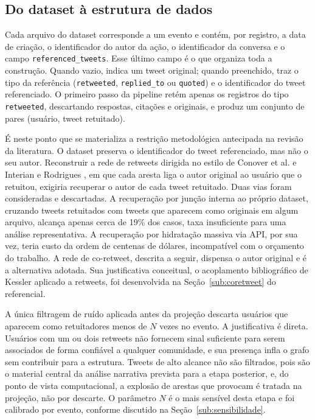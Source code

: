 \documentclass[conference]{IEEEtran}
\begin{document}
\subsection{Do dataset à estrutura de dados}
\label{sub:dataset}

Cada arquivo do dataset corresponde a um evento e contém, por registro, a data de criação, o identificador do autor da ação, o identificador da conversa e o campo \texttt{referenced\_tweets}. Esse último campo é o que organiza toda a construção. Quando vazio, indica um tweet original; quando preenchido, traz o tipo da referência (\texttt{retweeted}, \texttt{replied\_to} ou \texttt{quoted}) e o identificador do tweet referenciado. O primeiro passo da pipeline retém apenas os registros do tipo \texttt{retweeted}, descartando respostas, citações e originais, e produz um conjunto de pares (usuário, tweet retuitado).

É neste ponto que se materializa a restrição metodológica antecipada na revisão da literatura. O dataset preserva o identificador do tweet referenciado, mas não o seu autor. Reconstruir a rede de retweets dirigida no estilo de Conover et al. \cite{b_conover2011} e Interian e Rodrigues \cite{b_interian2023}, em que cada aresta liga o autor original ao usuário que o retuitou, exigiria recuperar o autor de cada tweet retuitado. Duas vias foram consideradas e descartadas. A recuperação por junção interna ao próprio dataset, cruzando tweets retuitados com tweets que aparecem como originais em algum arquivo, alcança apenas cerca de 19\% dos casos, taxa insuficiente para uma análise representativa. A recuperação por hidratação massiva via API, por sua vez, teria custo da ordem de centenas de dólares, incompatível com o orçamento do trabalho. A rede de co-retweet, descrita a seguir, dispensa o autor original e é a alternativa adotada. Sua justificativa conceitual, o acoplamento bibliográfico de Kessler \cite{b_kessler1963} aplicado a retweets, foi desenvolvida na Seção~\ref{sub:coretweet} do referencial.

A única filtragem de ruído aplicada antes da projeção descarta usuários que aparecem como retuitadores menos de $N$ vezes no evento. A justificativa é direta. Usuários com um ou dois retweets não fornecem sinal suficiente para serem associados de forma confiável a qualquer comunidade, e sua presença infla o grafo sem contribuir para a estrutura. Tweets de alto alcance não são filtrados, pois são o material central da análise narrativa prevista para a etapa posterior, e, do ponto de vista computacional, a explosão de arestas que provocam é tratada na projeção, não por descarte. O parâmetro $N$ é o mais sensível desta etapa e foi calibrado por evento, conforme discutido na Seção~\ref{sub:sensibilidade}.
\end{document}
